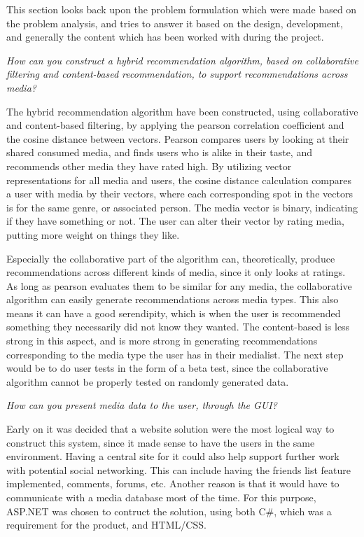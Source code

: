 This section looks back upon the problem formulation which were made based on the problem analysis, and tries to answer it based on the design, development, and generally the content which has been worked with during the project.

\textit{How can you construct a hybrid recommendation algorithm, based on collaborative filtering and content-based recommendation, to support recommendations across media?}

The hybrid recommendation algorithm have been constructed, using collaborative and content-based filtering, by applying the pearson correlation coefficient and the cosine distance between vectors. Pearson compares users by looking at their shared consumed media, and finds users who is alike in their taste, and recommends other media they have rated high. By utilizing vector representations for all media and users, the cosine distance calculation compares a user with media by their vectors, where each corresponding spot in the vectors is for the same genre, or associated person. The media vector is binary, indicating if they have something or not. The user can alter their vector by rating media, putting more weight on things they like.

Especially the collaborative part of the algorithm can, theoretically, produce recommendations across different kinds of media, since it only looks at ratings. As long as pearson evaluates them to be similar for any media, the collaborative algorithm can easily generate recommendations across media types. This also means it can have a good serendipity, which is when the user is recommended something they necessarily did not know they wanted. The content-based is less strong in this aspect, and is more strong in generating recommendations corresponding to the media type the user has in their medialist. The next step would be to do user tests in the form of a beta test, since the collaborative algorithm cannot be properly tested on randomly generated data.

\textit{How can you present media data to the user, through the GUI?}

Early on it was decided that a website solution were the most logical way to construct this system, since it made sense to have the users in the same environment. Having a central site for it could also help support further work with potential social networking. This can include having the friends list feature implemented, comments, forums, etc. Another reason is that it would have to communicate with a media database most of the time. For this purpose, ASP.NET was chosen to contruct the solution, using both C\#, which was a requirement for the product, and HTML/CSS. 

